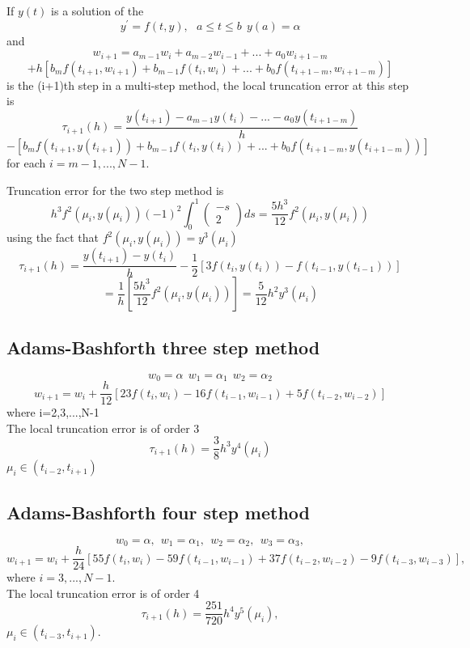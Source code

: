 \begin{definition}
If $y(t)$ is a solution of the 
\[y^{'}=f(t,y),\ \ \ a\leq t \leq b \ \ y(a)=\alpha \]
and
\[ w_{i+1} = a_{m-1}w_i +a_{m-2}w_{i-1} + ... + a_{0}w_{i+1-m}\]
\[
+h[b_{m}f(t_{i+1},w_{i+1}) + b_{m-1}f(t_{i},w_{i}) +...+ b_{0}f(t_{i+1-m},w_{i+1-m}) ]
\]
is the (i+1)th step in a multi-step method, the local truncation error at this step is
\[\tau_{i+1}(h)=\frac{y(t_{i+1})-
a_{m-1}y(t_i)  - ... - a_{0}y(t_{i+1-m})}{h}\]
\[
-[b_{m}f(t_{i+1},y(t_{i+1})) + b_{m-1}f(t_{i},y(t_{i})) +...+ b_{0}f(t_{i+1-m},y(t_{i+1-m})) ]
\]
for each $i=m-1,...,N-1$.
\end{definition}
\begin{example}
Truncation error for the two step  method is
\[h^3f^2(\mu_i,y(\mu_i))(-1)^2\int_{0}^1\left(\begin{array}{c}-s \\ 2 \end{array}\right)ds=\frac{5h^3}{12}f^2(\mu_i,y(\mu_i)) \]
using the fact that $f^2(\mu_i,y(\mu_i))=y^3(\mu_i)$
\[\tau_{i+1}(h) = \frac{y(t_{i+1})-y(t_i)}{h}-\frac{1}{2}[3f(t_i,y(t_i))-f(t_{i-1},y(t_{i-1}))] \]
\[=\frac{1}{h}\left[\frac{5h^3}{12}f^2(\mu_i,y(\mu_i))\right] =
\frac{5}{12}h^2 y^3(\mu_i)\]
\end{example}

\subsection{Adams-Bashforth three step method}
\[ w_0=\alpha \ \ w_1=\alpha_1 \ \ w_2 = \alpha_2 \]
\[w_{i+1} = w_{i}+\frac{h}{12}[23f(t_i,w_i) -16 f(t_{i-1},w_{i-1})+5f(t_{i-2},w_{i-2})] \]
where i=2,3,...,N-1\\
The local truncation error is of order 3 
\[\tau_{i+1}(h) =\frac{3}{8}h^3 y^4(\mu_i)\]
$\mu_i \in (t_{i-2},t_{i+1})$


\subsection{Adams-Bashforth four step method}
\[ w_0=\alpha, \ \ w_1=\alpha_1, \ \ w_2 = \alpha_2, \ \ w_3=\alpha_3, \]
\[w_{i+1} = w_{i}+\frac{h}{24}[55f(t_i,w_i) -59 f(t_{i-1},w_{i-1})+37f(t_{i-2},w_{i-2}) -9 f(t_{i-3},w_{i-3})], \]
where $i=3,...,N-1.$\\
The local truncation error is of order 4 
\[\tau_{i+1}(h) =\frac{251}{720}h^4 y^5(\mu_i),\]
$\mu_i \in (t_{i-3},t_{i+1}).$

